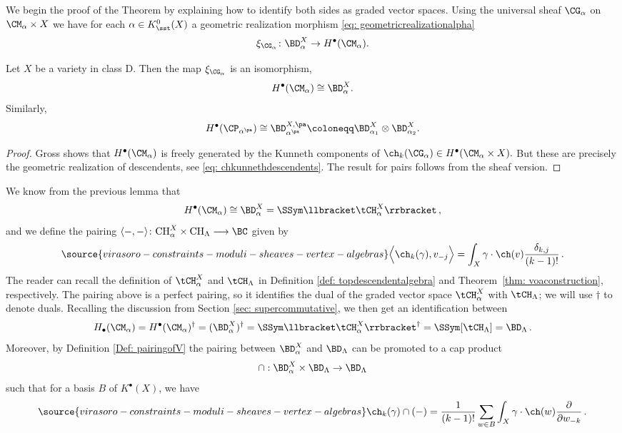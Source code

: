 We begin the proof of the Theorem by explaining how to identify both sides as graded vector spaces. Using the universal sheaf $\CG_{\alpha}$ on $\CM_{\alpha}\times X$ we have for each $\alpha\in K_\sst^0(X)$ a geometric realization morphism \eqref{eq: geometricrealizationalpha}
\[\xi_{\CG_\alpha}\colon \BD^X_\alpha\to H^\bullet(\CM_\alpha).\]

\begin{lemma}[{\cite[Theorem 4.15]{Gr19}}]
\notready
\label{Lem: isomorphism}
Let $X$ be a variety in class D. Then the map $\xi_{\CG_{\alpha}}$ is an isomorphism,
\[H^\bullet(\CM_\alpha)\cong \BD^X_\alpha.\]
Similarly,
\[H^\bullet(\CP_{\alpha^{\pa}})\cong \BD^{X, \pa}_{\alpha^{\pa}}\coloneqq \BD^X_{\alpha_1}\otimes \BD^X_{\alpha_2}.\]
\end{lemma}
\begin{proof}
Gross shows that $H^\bullet(\CM_\alpha)$ is freely generated by the Kunneth components of $\ch_k(\CG_\alpha)\in H^\bullet(\CM_\alpha\times X).$ But these are precisely the geometric realization of descendents, see \eqref{eq: chkunnethdescendents}. The result for pairs follows from the sheaf version.\qedhere
\end{proof}


We know from the previous lemma that
$$
H^\bullet(\CM_\alpha) \cong \BD^X_\alpha =\SSym\llbracket \tCH^X_\alpha\rrbracket \,,
$$
and we define the pairing $
\langle -,-\rangle \colon \text{CH}^X_{\alpha}\times \text{CH}_{\Lambda} \longrightarrow \BC
$
given by \begin{equation}
\label{Eq: capproductchk}
\source{virasoro-constraints-moduli-sheaves-vertex-algebras}
\Big\langle\ch_{k}(\gamma),v_{-j}\Big\rangle  =\int_X\gamma \cdot \ch(v) \frac{\delta_{k,j}}{(k-1)!}\,.
\end{equation}
The reader can recall the definition of $\tCH^X_\alpha$ and $\tCH_\Lambda$ in Definition \ref{def: topdescendentalgebra} and Theorem~\ref{thm: voaconstruction}, respectively. The pairing above is a perfect pairing, so it identifies the dual of the graded vector space $\tCH^X_\alpha$ with $\tCH_\Lambda$; we will use $\dagger$ to denote duals. Recalling the discussion from Section \ref{sec: supercommutative}, we then get an identification between
\[H_\bullet(\CM_\alpha)=H^\bullet(\CM_\alpha)^\dagger=
(\BD_\alpha^X)^\dagger=\SSym\llbracket\tCH_\alpha^X\rrbracket ^\dagger=\SSym[\tCH_\Lambda]=\BD_\Lambda\,.\]
Moreover, by Definition \ref{Def: pairingofV} the pairing between $\BD_\alpha^X$ and $\BD_\Lambda$ can be promoted to a cap product
$$\cap:\BD^X_{\alpha}\times \BD_{\Lambda}\to \BD_{\Lambda}$$
such that for a basis $B$ of $K^\bullet(X)$, we have
\begin{equation}\label{eq: capdescendents}
\source{virasoro-constraints-moduli-sheaves-vertex-algebras}
\ch_{k}(\gamma)\cap(-)=\frac{1}{(k-1)!}\sum_{w\in B}\int_X\gamma\cdot \ch(w)\frac{\partial}{\partial w_{-k}}\,.
\end{equation}

